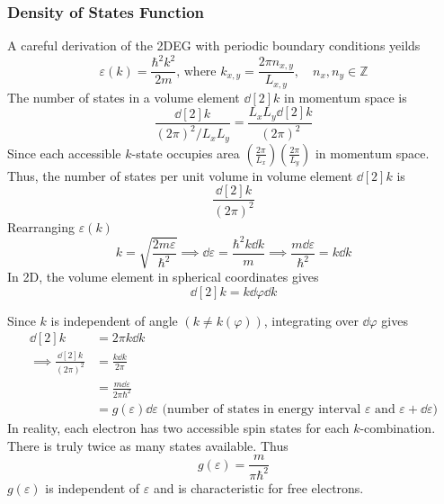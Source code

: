 \documentclass[12pt,a4paper,titlepage]{article}
\newcommand{\trm}[1]{\textrm{#1}} %
\begin{document}
\subsubsection*{Density of States Function}
A careful derivation of the 2DEG with periodic boundary conditions yeilds
\begin{equation}
\varepsilon(k)=\frac{\hbar^{2}k^{2}}{2m}\trm{, where }k_{x,y}=\frac{2\pi n_{x,y}}{L_{x,y}},\quad n_{x},n_{y}\in\mathbb{Z}
\end{equation}
The number of states in a volume element $\dd[2]{k}$ in momentum space is
\begin{equation}
\frac{\dd[2]{k}}{(2\pi)^{2}/L_{x}L_{y}}=\frac{L_{x}L_{y}\dd[2]{k}}{(2\pi)^{2}}
\end{equation}
Since each accessible $k$-state occupies area $\left(\frac{2\pi}{L_{x}}\right)\left(\frac{2\pi}{L_{y}}\right)$ in momentum space. Thus, the number of states per unit volume in volume element $\dd[2]{k}$ is
\begin{equation}
\frac{\dd[2]{k}}{(2\pi)^{2}}
\end{equation}
Rearranging $\varepsilon(k)$
\begin{equation}
k=\sqrt{\frac{2m\varepsilon}{\hbar^{2}}}\implies \dd{\varepsilon}=\frac{\hbar^{2}k\dd{k}}{m}\implies \frac{m\dd{\varepsilon}}{\hbar^{2}}=k\dd{k}
\end{equation}
In 2D, the volume element in spherical coordinates gives
\begin{equation}
\dd[2]{k}=k\dd{\varphi}\dd{k}
\end{equation}

Since $k$ is independent of angle $(k\neq k(\varphi))$, integrating over $\dd{\varphi}$ gives
\begin{equation}
\begin{aligned}
\dd[2]{k}&=2\pi k\dd{k}\\
\implies \frac{\dd[2]{k}}{(2\pi)^{2}}&=\frac{k\dd{k}}{2\pi}\\
&=\frac{m\dd{\varepsilon}}{2\pi\hbar^{2}}\\
&=g(\varepsilon)\dd{\varepsilon}\trm{ (number of states in energy interval $\varepsilon$ and $\varepsilon+\dd{\varepsilon})$}
\end{aligned}
\end{equation}
In reality, each electron has two accessible spin states for each $k$-combination. There is truly twice as many states available. Thus
\begin{equation}
g(\varepsilon)=\frac{m}{\pi\hbar^{2}}
\end{equation}
$g(\varepsilon)$ is independent of $\varepsilon$ and is characteristic for free electrons.\\
\end{document}
